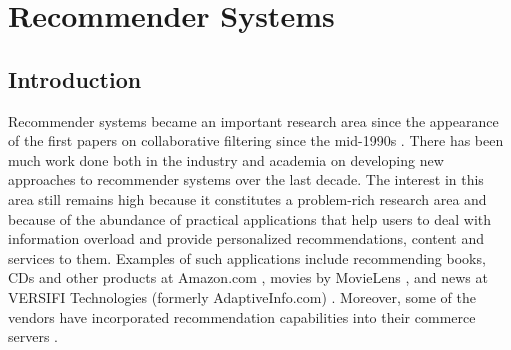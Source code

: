 
\chapter{Recommender Systems} %

\label{recommender} %


\section{Introduction}
Recommender systems became an important research area since the appearance of the first papers on collaborative filtering since the mid-1990s  \citep{recom_45} \citep{recom_86} \citep{recom_97}. There has been much work done both in the industry and academia on developing new approaches to recommender systems over the last decade. The interest in this area still remains high because it constitutes a problem-rich research area and because of the abundance of practical applications that help users to deal with information overload and provide personalized recommendations, content and services to them. Examples of such applications include recommending books, CDs and other products at Amazon.com \citep{recom_61}, movies by MovieLens \citep{recom_67}, and news at VERSIFI Technologies (formerly AdaptiveInfo.com) \citep{recom_14}. Moreover, some of the vendors have incorporated recommendation capabilities into their commerce servers \citep{recom_78}.


